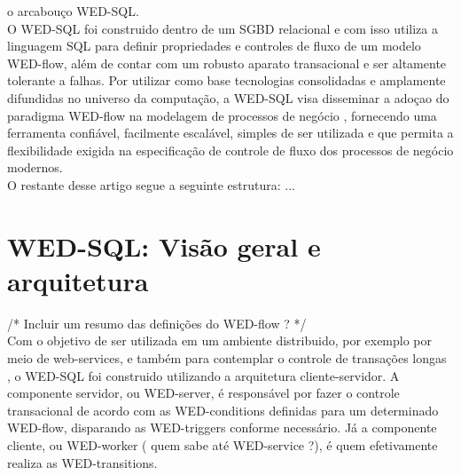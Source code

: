 \documentclass[conference]{IEEEtran}
\begin{document}
o arcabouço WED-SQL.
\\
\indent O WED-SQL foi construido dentro de um SGBD relacional e com isso utiliza a linguagem SQL para definir propriedades
e controles de fluxo de um modelo WED-flow, além de contar com um robusto aparato transacional e ser altamente tolerante
a falhas. Por utilizar como base tecnologias consolidadas e amplamente difundidas no universo da computação, a WED-SQL visa 
disseminar a adoçao do paradigma WED-flow na modelagem de processos de negócio , fornecendo uma ferramenta confiável, facilmente
escalável, simples de ser utilizada e que permita a flexibilidade exigida na especificação de controle de fluxo dos processos
de negócio modernos.
\\
\indent O restante desse artigo segue a seguinte estrutura: ...
  

\section{WED-SQL: Visão geral e arquitetura}
/* Incluir um resumo das definições do WED-flow ? */\\
Com o objetivo de  ser utilizada em um ambiente distribuido, por exemplo por meio de web-services, e também para contemplar 
o controle de transações longas \cite{MOLINA}, o WED-SQL foi construido utilizando a arquitetura cliente-servidor. A componente
servidor, ou WED-server, é responsável por fazer o controle transacional de acordo com as WED-conditions definidas
para um determinado WED-flow, disparando as WED-triggers conforme necessário. Já a componente cliente, ou WED-worker (
quem sabe até WED-service ?), é quem efetivamente realiza as WED-transitions.
\\
\end{document}
